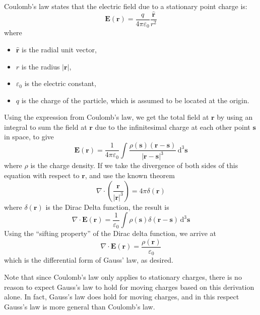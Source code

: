 \documentclass[a4paper, 12pt]{article}
\begin{document}
\begin{mdframed}[%
    style=mystyle,%
    frametitle={Outline of proof}]

Coulomb's law states that the electric field due to a stationary point charge is: 
\[
    \mathbf{E}(\mathbf{r}) = \frac{q}{4 \pi \varepsilon_0} \frac{\hat{\mathbf{r}}}{r^2}
\]
where
\begin{itemize}[noitemsep]
    \item \(\hat{\mathbf{r}}\) is the radial unit vector,
    \item \(r\) is the radius \(|\mathbf{r}|\),
    \item \(\varepsilon_0\) is the electric constant,
    \item \(q\) is the charge of the particle, which is assumed to be located at the origin.
\end{itemize}

Using the expression from Coulomb's law, we get the total field at \(\mathbf{r}\) by using an integral to sum the field at \(\mathbf{r}\) due to the infinitesimal charge at each other point \(\mathbf{s}\) in space, to give 
\[
    \mathbf{E}(\mathbf{r}) = \frac{1}{4 \pi \varepsilon_0} 
        \int \frac{\rho(\mathbf{s})(\mathbf{r} - \mathbf{s})}{|\mathbf{r} - \mathbf{s}|^3}
            \, \mathrm{d}^{3}\mathbf{s}
\]
where \(\rho\) is the charge density. If we take the divergence of both sides of this equation with respect to \(\mathbf{r}\), and use the known theorem
\[
    \nabla \cdot \left ( \frac{\mathbf{r}}{|\mathbf{r}|^3} \right ) = 4\pi \delta(\mathbf{r})
\]
where \(\delta(\mathbf{r})\) is the Dirac Delta function, the result is
\[
    \nabla \cdot \mathbf{E}(\mathbf{r}) 
    = \frac{1}{\varepsilon_0} \int \rho(\mathbf{s}) 
        \delta (\mathbf{r} - \mathbf{s}) \, \mathrm{d}^{3}\mathbf{s}
\]
Using the ``sifting property'' of the Dirac delta function, we arrive at 
\[
    \nabla \cdot \mathbf{E}(\mathbf{r}) = \frac{\rho(\mathbf{r})}{\varepsilon_0}
\]
which is the differential form of Gauss' law, as desired.
\end{mdframed}
Note that since Coulomb's law only applies to stationary charges, there is no reason to expect Gauss's law to hold for moving charges based on this derivation alone. In fact, Gauss's law does hold for moving charges, and in this respect Gauss's law is more general than Coulomb's law. 
\end{document}
